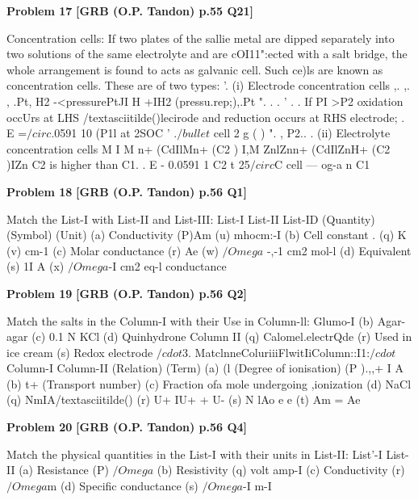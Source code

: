 \begin{problembox}
\textbf{Problem 17} \hfill \textbf{[GRB (O.P. Tandon) p.55 Q21]}
\label{q:ext-grb_all_questions-17}

Concentration cells: If two plates of the sallie metal 
are dipped separately into two solutions of the same electrolyte 
and are cOI11":ected with a salt bridge, the whole arrangement is 
found to acts as galvanic cell. Such ce)ls are known as 
concentration cells. These are of two types: '. 
(i) Electrode concentration cells 
,. 
,. , 
.Pt, H2 -<pressurePtJI H +IH2 (pressu.rep;),.Pt 
". 
. 
. 
' 
. 
. If PI >P2 oxidation occUrs at LHS /textasciitilde()lecirode and reduction 
occurs at RHS electrode; 
. 
E 
=$/circ$.0591 10 (P1l at 2SOC 
' .$/bullet$ 
cell 
2 
g ( 
) ". 
, 
P2.. . 
(ii) Electrolyte concentration cells 
M I M n+ (CdIlMn+ (C2 ) I,M 
ZnlZnn+ (CdIlZnH+ (C2 )IZn 
C2 is higher than C1. . 
E 
- 0.0591 1 
C2 t 25$/circ$C 
cell --- og-a 
n 
C1
\end{problembox}

\begin{problembox}
\textbf{Problem 18} \hfill \textbf{[GRB (O.P. Tandon) p.56 Q1]}
\label{q:ext-grb_all_questions-18}

Match the List-I with List-II and List-III: 
List-I 
List-II 
List-ID 
(Quantity) 
(Symbol) 
(Unit) 
(a) Conductivity 
(P)Am 
(u) mhocm:-I 
(b) Cell constant . 
(q) K 
(v) cm-1 
(c) Molar conductance (r) Ae 
(w) $/Omega$ -,-1 cm2 mol-l 
(d) Equivalent 
(s) 1I A 
(x) $/Omega$-I cm2 eq-l 
conductance
\end{problembox}

\begin{problembox}
\textbf{Problem 19} \hfill \textbf{[GRB (O.P. Tandon) p.56 Q2]}
\label{q:ext-grb_all_questions-19}

Match the salts in the Column-I with their Use in Column-ll: 
 Glumo-I 
(b) Agar-agar 
(c) 0.1 N KCl 
(d) Quinhydrone 
Column II 
(q) Calomel.electrQde 
(r) Used in ice cream 
(s) Redox electrode 
$/cdot$3. MatclnneColuriiiFlwitIiColumn::I1:$/cdot$ 
Column-I 
Column-II 
(Relation) 
(Term) 
(a) (l (Degree of ionisation) 
(P ).,,+ I A 
(b) t+ (Transport number) 
(c) Fraction ofa mole 
undergoing ,ionization 
(d) NaCl 
(q) NmIA/textasciitilde() 
(r) U+ IU+ + U-
(s) N lAo 
e 
e 
(t) Am = Ae
\end{problembox}

\begin{problembox}
\textbf{Problem 20} \hfill \textbf{[GRB (O.P. Tandon) p.56 Q4]}
\label{q:ext-grb_all_questions-20}

Match the physical quantities in the List-I with their units in 
List-II: 
List'-I 
List-II 
(a) Resistance 
(P) $/Omega$ 
(b) Resistivity 
(q) volt amp-I 
(c) Conductivity 
(r) $/Omega$m 
(d) Specific conductance 
(s) $/Omega$-I m-I
\end{problembox}

